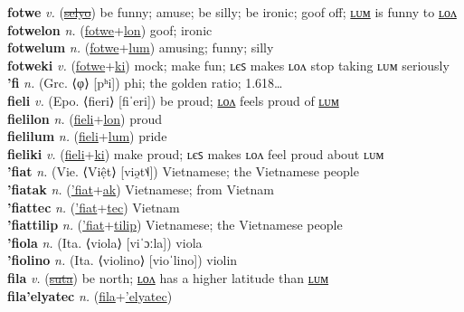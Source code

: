 \textbf{fotwe} \textit{v.} (\hyperref[selyo]{\sout{selyo}})
be funny; amuse; be silly; be ironic; goof off; \hyperref[fotwelum]{ʟᴜᴍ} is funny to \hyperref[fotwelon]{ʟᴏᴧ} \label{fotwe} \\
\textbf{fotwelon} \textit{n.} (\hyperref[fotwe]{fotwe}+\hyperref[lon]{lon})
goof; ironic \label{fotwelon} \\
\textbf{fotwelum} \textit{n.} (\hyperref[fotwe]{fotwe}+\hyperref[lum]{lum})
amusing; funny; silly \label{fotwelum} \\
\textbf{fotweki} \textit{v.} (\hyperref[fotwe]{fotwe}+\hyperref[ki]{ki})
mock; make fun; ʟєꜱ makes ʟᴏᴧ stop taking ʟᴜᴍ seriously \label{fotweki} \\
\textbf{'fi} \textit{n.} (Grc. ⟨φ⟩ [pʰi])
phi; the golden ratio; 1.618… \label{'fi} \\
\textbf{fieli} \textit{v.} (Epo. ⟨fieri⟩ [fiˈeri])
be proud; \hyperref[fielilon]{ʟᴏᴧ} feels proud of \hyperref[fielilum]{ʟᴜᴍ} \label{fieli} \\
\textbf{fielilon} \textit{n.} (\hyperref[fieli]{fieli}+\hyperref[lon]{lon})
proud \label{fielilon} \\
\textbf{fielilum} \textit{n.} (\hyperref[fieli]{fieli}+\hyperref[lum]{lum})
pride \label{fielilum} \\
\textbf{fieliki} \textit{v.} (\hyperref[fieli]{fieli}+\hyperref[ki]{ki})
make proud; ʟєꜱ makes ʟᴏᴧ feel proud about ʟᴜᴍ \label{fieliki} \\
\textbf{'fiat} \textit{n.} (Vie. ⟨Việt⟩ [viə̯t˦˨])
Vietnamese; the Vietnamese people \label{'fiat} \\
\textbf{'fiatak} \textit{n.} (\hyperref['fiat]{'fiat}+\hyperref[ak]{ak})
Vietnamese; from Vietnam \label{'fiatak} \\
\textbf{'fiattec} \textit{n.} (\hyperref['fiat]{'fiat}+\hyperref[tec]{tec})
Vietnam \label{'fiattec} \\
\textbf{'fiattilip} \textit{n.} (\hyperref['fiat]{'fiat}+\hyperref[tilip]{tilip})
Vietnamese; the Vietnamese people \label{'fiattilip} \\
\textbf{'fiola} \textit{n.} (Ita. ⟨viola⟩ [viˈɔːla])
viola \label{'fiola} \\
\textbf{'fiolino} \textit{n.} (Ita. ⟨violino⟩ [vioˈlino])
violin \label{'fiolino} \\
\textbf{fila} \textit{v.} (\hyperref[suta]{\sout{suta}})
be north; \hyperref[filalon]{ʟᴏᴧ} has a higher latitude than \hyperref[filalum]{ʟᴜᴍ} \label{fila} \\
\textbf{fila'elyatec} \textit{n.} (\hyperref[fila]{fila}+\hyperref['elyatec]{'elyatec})
